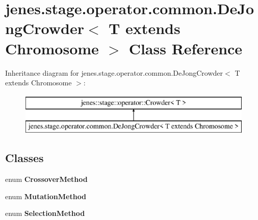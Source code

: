 \hypertarget{classjenes_1_1stage_1_1operator_1_1common_1_1_de_jong_crowder_3_01_t_01extends_01_chromosome_01_4}{\section{jenes.\-stage.\-operator.\-common.\-De\-Jong\-Crowder$<$ T extends Chromosome $>$ Class Reference}
\label{classjenes_1_1stage_1_1operator_1_1common_1_1_de_jong_crowder_3_01_t_01extends_01_chromosome_01_4}
}
Inheritance diagram for jenes.\-stage.\-operator.\-common.\-De\-Jong\-Crowder$<$ T extends Chromosome $>$\-:\begin{figure}[H]
\begin{center}
\leavevmode
\includegraphics[height=2.000000cm]{classjenes_1_1stage_1_1operator_1_1common_1_1_de_jong_crowder_3_01_t_01extends_01_chromosome_01_4}
\end{center}
\end{figure}
\subsection*{Classes}
\begin{DoxyCompactItemize}
\item 
enum {\bfseries Crossover\-Method}
\item 
enum {\bfseries Mutation\-Method}
\item 
enum {\bfseries Selection\-Method}
\end{DoxyCompactItemize}
